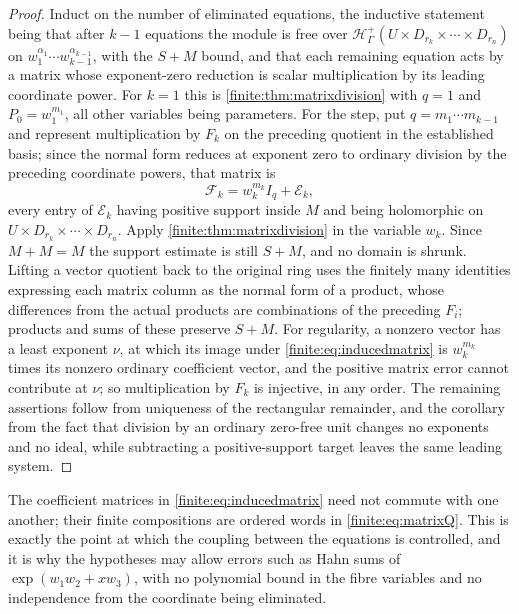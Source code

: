 \documentclass[11pt,letterpaper]{article}
\theoremstyle{definition}
\theoremstyle{remark}
\newcommand{\Hp}{\mathscr H^{+}}
\numberwithin{equation}{section}
\begin{document}
\begin{proof}
Induct on the number of eliminated equations, the inductive statement being that after $k-1$ equations the module is free over $\Hp_\Gamma(U\times D_{r_k}\times\cdots\times D_{r_n})$ on $w_1^{\alpha_1}\cdots w_{k-1}^{\alpha_{k-1}}$, with the $S+M$ bound, and that each remaining equation acts by a matrix whose exponent-zero reduction is scalar multiplication by its leading coordinate power. For $k=1$ this is \cref{finite:thm:matrixdivision} with $q=1$ and $P_0=w_1^{m_1}$, all other variables being parameters. For the step, put $q=m_1\cdots m_{k-1}$ and represent multiplication by $F_k$ on the preceding quotient in the established basis; since the normal form reduces at exponent zero to ordinary division by the preceding coordinate powers, that matrix is
\begin{equation}\label{finite:eq:inducedmatrix}
 \mathcal F_k=w_k^{m_k}I_q+\mathcal E_k,
\end{equation}
every entry of $\mathcal E_k$ having positive support inside $M$ and being holomorphic on $U\times D_{r_k}\times\cdots\times D_{r_n}$. Apply \cref{finite:thm:matrixdivision} in the variable $w_k$. Since $M+M=M$ the support estimate is still $S+M$, and no domain is shrunk. Lifting a vector quotient back to the original ring uses the finitely many identities expressing each matrix column as the normal form of a product, whose differences from the actual products are combinations of the preceding $F_i$; products and sums of these preserve $S+M$. For regularity, a nonzero vector has a least exponent $\nu$, at which its image under \eqref{finite:eq:inducedmatrix} is $w_k^{m_k}$ times its nonzero ordinary coefficient vector, and the positive matrix error cannot contribute at $\nu$; so multiplication by $F_k$ is injective, in any order. The remaining assertions follow from uniqueness of the rectangular remainder, and the corollary from the fact that division by an ordinary zero-free unit changes no exponents and no ideal, while subtracting a positive-support target leaves the same leading system.
\end{proof}

The coefficient matrices in \eqref{finite:eq:inducedmatrix} need not commute with one another; their finite compositions are ordered words in \eqref{finite:eq:matrixQ}. This is exactly the point at which the coupling between the equations is controlled, and it is why the hypotheses may allow errors such as Hahn sums of $\exp(w_1w_2+xw_3)$, with no polynomial bound in the fibre variables and no independence from the coordinate being eliminated.
\end{document}
